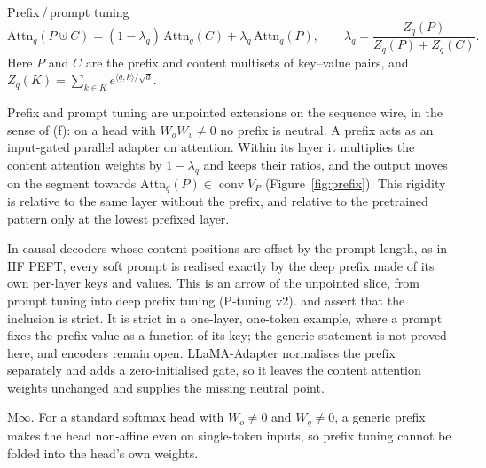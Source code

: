 \begin{example*}{Prefix\,/\,prompt tuning}\label{ex:prefix}%
\[
  \mathrm{Attn}_q(P\uplus C)=(1-\lambda_q)\,\mathrm{Attn}_q(C)+\lambda_q\,\mathrm{Attn}_q(P),\qquad
  \lambda_q=\frac{Z_q(P)}{Z_q(P)+Z_q(C)}.
\]
Here $P$ and $C$ are the prefix and content multisets of key--value pairs, and
$Z_q(K)=\sum_{k\in K}e^{\langle q,k\rangle/\sqrt d}$.
\begin{exVIIlines}
\item[Image] Prefix and prompt tuning are unpointed extensions on the sequence wire, in the sense of
  (f): on a head with $W_oW_v\ne0$ no prefix is neutral. A prefix acts as an input-gated
  parallel adapter on attention. Within its layer it multiplies the content attention weights by $1-\lambda_q$ and
  keeps their ratios, and the output moves on the segment towards $\mathrm{Attn}_q(P)\in\operatorname{conv}V_P$
  (Figure~\ref{fig:prefix}). This rigidity is relative to the same layer without the prefix, and relative to the
  pretrained pattern only at the lowest prefixed layer.
\item[Arrows] In causal decoders whose content positions are offset by the prompt length, as in HF PEFT, every soft
  prompt is realised exactly by the deep prefix made of its own per-layer keys and values. This is an arrow of the
  unpointed slice, from prompt tuning into deep prefix tuning (P-tuning v2). \citet{petrov2023prompting} and
  \citet{li2021prefix} assert that the inclusion is strict. It is strict in a one-layer, one-token example, where a
  prompt fixes the prefix value as a function of its key; the generic statement is not proved here, and encoders remain
  open. LLaMA-Adapter \citep{zhang2023llama} normalises the prefix separately and adds a zero-initialised gate, so it
  leaves the content attention weights unchanged and supplies the missing neutral point.
\item[Merge] M$\infty$. For a standard softmax head with $W_o\ne0$ and $W_q\ne0$, a generic prefix makes the head
  non-affine even on single-token inputs, so prefix tuning cannot be folded into the head's own weights.
\end{exVIIlines}
\end{example*}

